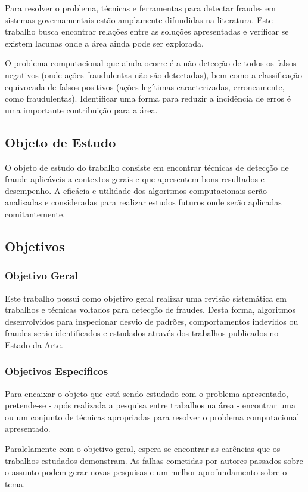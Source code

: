 \documentclass[smallextended]{svjour3}       %
\begin{document}
Para resolver o problema, técnicas e ferramentas para detectar fraudes em sistemas governamentais estão amplamente difundidas na literatura. Este trabalho busca encontrar relações entre as soluções apresentadas e verificar se existem lacunas onde a área ainda pode ser explorada.

O problema computacional que ainda ocorre é a não detecção de todos os falsos negativos (onde ações fraudulentas não são detectadas), bem como a classificação equivocada de falsos positivos (ações legítimas caracterizadas, erroneamente, como fraudulentas). Identificar uma forma para reduzir a incidência de erros é uma importante contribuição para a área. 

\subsection{Objeto de Estudo}
O objeto de estudo do trabalho consiste em encontrar técnicas de detecção de fraude aplicáveis a contextos gerais e que apresentem bons resultados e desempenho. A eficácia e utilidade dos algoritmos computacionais serão analisadas e consideradas para realizar estudos futuros onde serão aplicadas comitantemente.

\subsection{Objetivos}

\subsubsection{Objetivo Geral}
Este trabalho possui como objetivo geral realizar uma revisão sistemática em trabalhos e técnicas voltados para detecção de fraudes. Desta forma, algoritmos desenvolvidos para inspecionar desvio de padrões, comportamentos indevidos ou fraudes serão identificados e estudados através dos trabalhos publicados no Estado da Arte.

\subsubsection{Objetivos Específicos}

Para encaixar o objeto que está sendo estudado com o problema apresentado, pretende-se - após realizada a pesquisa entre trabalhos na área - encontrar uma ou um conjunto de técnicas apropriadas para resolver o problema computacional apresentado.

Paralelamente com o objetivo geral, espera-se encontrar as carências que os trabalhos estudados demonstram. As falhas cometidas por autores passados sobre o assunto podem gerar novas pesquisas e um melhor aprofundamento sobre o tema. 
\end{document}
